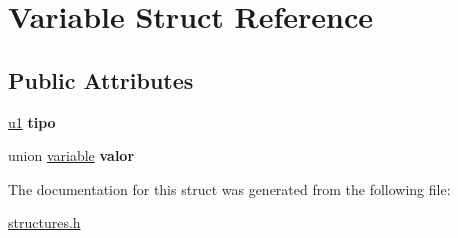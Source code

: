 \hypertarget{structVariable}{}\section{Variable Struct Reference}
\label{structVariable}
\subsection*{Public Attributes}
\begin{DoxyCompactItemize}
\item 
\mbox{\label{structVariable_a9bb59e669f31f27cd88ed4b995de9616}} 
\mbox{\hyperlink{structures_8h_ad9f4cdb6757615aae2fad89dab3c5470}{u1}} {\bfseries tipo}
\item 
\mbox{\label{structVariable_aed68dfc6e0dd73a418b882888ff5fe64}} 
union \mbox{\hyperlink{unionvariable}{variable}} {\bfseries valor}
\end{DoxyCompactItemize}


The documentation for this struct was generated from the following file\+:\begin{DoxyCompactItemize}
\item 
\mbox{\hyperlink{structures_8h}{structures.\+h}}\end{DoxyCompactItemize}
